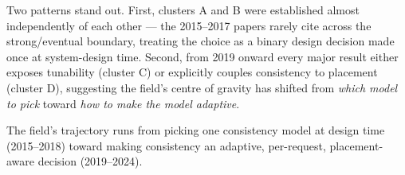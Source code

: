Two patterns stand out. First, clusters A and B were established almost independently of each other ---
the 2015--2017 papers rarely cite across the strong/eventual boundary, treating the choice as a
binary design decision made once at system-design time. Second, from 2019 onward every major result
either exposes tunability (cluster C) or explicitly couples consistency to placement (cluster D),
suggesting the field's centre of gravity has shifted from \emph{which model to pick} toward \emph{how
to make the model adaptive}.

\begin{keytakeaway}
The field's trajectory runs from picking one consistency model at design time (2015--2018) toward
making consistency an adaptive, per-request, placement-aware decision (2019--2024).
\end{keytakeaway}
